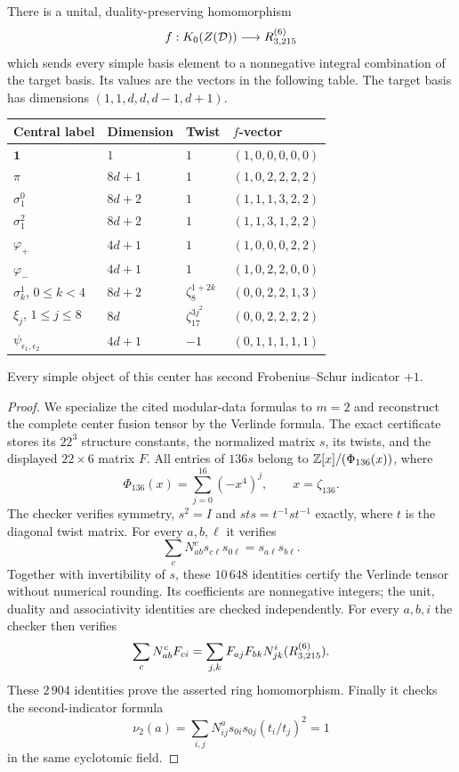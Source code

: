 \begin{proposition}
\label{prop:cyclic-eight-center}
There is a unital, duality-preserving homomorphism
\[
 f:K_0(Z(\mathcal D))\longrightarrow R^{(6)}_{3,215}
\]
which sends every simple basis element to a nonnegative integral combination
of the target basis. Its values are the vectors in the following table.
The target basis has dimensions $(1,1,d,d,d-1,d+1)$.
\begin{center}
\small
\begin{tabular}{@{}llll@{}}
\toprule
Central label & Dimension & Twist & $f$-vector\\
\midrule
$\mathbf1$ & $1$ & $1$ & $(1,0,0,0,0,0)$\\
$\pi$ & $8d+1$ & $1$ & $(1,0,2,2,2,2)$\\
$\sigma^0_1$ & $8d+2$ & $1$ & $(1,1,1,3,2,2)$\\
$\sigma^2_1$ & $8d+2$ & $1$ & $(1,1,3,1,2,2)$\\
$\varphi_+$ & $4d+1$ & $1$ & $(1,0,0,0,2,2)$\\
$\varphi_-$ & $4d+1$ & $1$ & $(1,0,2,2,0,0)$\\
$\sigma^1_k$, $0\le k<4$ & $8d+2$ & $\zeta_8^{1+2k}$ & $(0,0,2,2,1,3)$\\
$\xi_j$, $1\le j\le8$ & $8d$ & $\zeta_{17}^{3j^2}$ & $(0,0,2,2,2,2)$\\
$\psi_{\epsilon_1,\epsilon_2}$ & $4d+1$ & $-1$ & $(0,1,1,1,1,1)$\\
\bottomrule
\end{tabular}
\end{center}
Every simple object of this center has second Frobenius--Schur indicator
$+1$.
\end{proposition}
\begin{proof}
We specialize the cited modular-data formulas to $m=2$ and reconstruct the
complete center fusion tensor by the Verlinde formula. The exact certificate
stores its $22^3$ structure constants, the normalized matrix $s$, its twists,
and the displayed $22\times6$ matrix $F$.
All entries of $136s$ belong to
$\mathbb Z[x]/(\Phi_{136}(x))$, where
\[
 \Phi_{136}(x)=\sum_{j=0}^{16}(-x^4)^j,
 \qquad x=\zeta_{136}.
\]
The checker verifies symmetry, $s^2=I$ and
$sts=t^{-1}st^{-1}$ exactly, where $t$ is the diagonal twist matrix.
For every $a,b,\ell$ it verifies
\[
 \sum_c N_{ab}^{c}s_{c\ell}s_{0\ell}
       =s_{a\ell}s_{b\ell}.
\]
Together with invertibility of $s$, these $10\,648$ identities certify the
Verlinde tensor without numerical rounding. Its coefficients are
nonnegative integers; the unit, duality and associativity identities are
checked independently. For every $a,b,i$ the checker then verifies
\[
 \sum_c N_{ab}^{c}F_{ci}
 =\sum_{j,k}F_{aj}F_{bk}N_{jk}^{i}(R^{(6)}_{3,215}).
\]
These $2\,904$ identities prove the asserted ring homomorphism. Finally it
checks the second-indicator formula
\[
 \nu_2(a)=\sum_{i,j}N_{ij}^{a}s_{0i}s_{0j}
                     (t_i/t_j)^2=1
\]
in the same cyclotomic field.
\end{proof}

